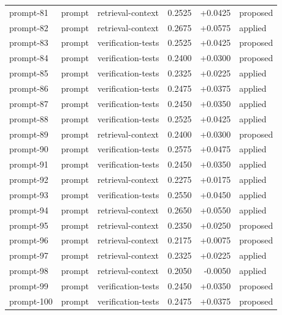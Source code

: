 \begin{center}
\begin{longtable}{llp{5.2cm}rrl}
prompt-81 & prompt & retrieval-context & 0.2525 & +0.0425 & proposed \\
prompt-82 & prompt & retrieval-context & 0.2675 & +0.0575 & applied \\
prompt-83 & prompt & verification-tests & 0.2525 & +0.0425 & proposed \\
prompt-84 & prompt & verification-tests & 0.2400 & +0.0300 & proposed \\
prompt-85 & prompt & verification-tests & 0.2325 & +0.0225 & applied \\
prompt-86 & prompt & verification-tests & 0.2475 & +0.0375 & applied \\
prompt-87 & prompt & verification-tests & 0.2450 & +0.0350 & applied \\
prompt-88 & prompt & verification-tests & 0.2525 & +0.0425 & applied \\
prompt-89 & prompt & retrieval-context & 0.2400 & +0.0300 & proposed \\
prompt-90 & prompt & verification-tests & 0.2575 & +0.0475 & applied \\
prompt-91 & prompt & verification-tests & 0.2450 & +0.0350 & applied \\
prompt-92 & prompt & retrieval-context & 0.2275 & +0.0175 & applied \\
prompt-93 & prompt & verification-tests & 0.2550 & +0.0450 & applied \\
prompt-94 & prompt & retrieval-context & 0.2650 & +0.0550 & applied \\
prompt-95 & prompt & retrieval-context & 0.2350 & +0.0250 & proposed \\
prompt-96 & prompt & retrieval-context & 0.2175 & +0.0075 & proposed \\
prompt-97 & prompt & retrieval-context & 0.2325 & +0.0225 & applied \\
prompt-98 & prompt & retrieval-context & 0.2050 & -0.0050 & applied \\
prompt-99 & prompt & verification-tests & 0.2450 & +0.0350 & proposed \\
prompt-100 & prompt & verification-tests & 0.2475 & +0.0375 & proposed \\
\bottomrule\end{longtable}\end{center}
\clearpage
